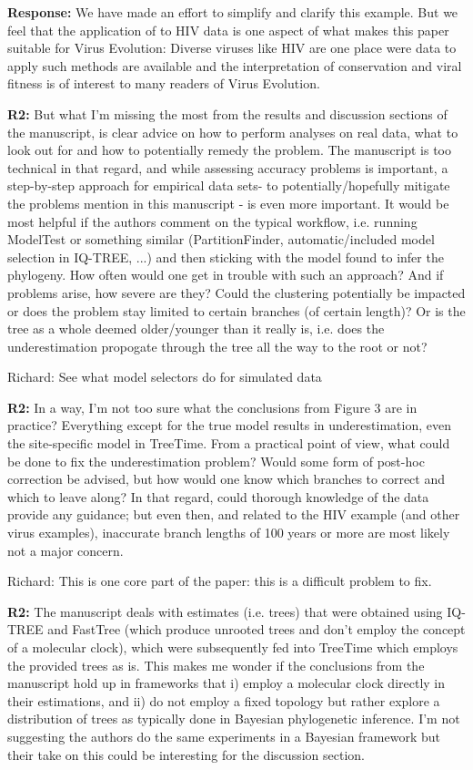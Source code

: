 \documentclass[aps,rmp,onecolumn]{revtex4-1}
\newcommand{\Richard}[1]{{\color{drab}Richard: #1}}
\newcommand{\refb}[1]{\textbf{R2:} #1}
\newcommand{\response}[1]{{\color{black}\textbf{Response:} #1}}
\begin{document}
\response{We have made an effort to simplify and clarify this example. But we feel that the application of to HIV data is one aspect of what makes this paper suitable for Virus Evolution: Diverse viruses like HIV are one place were data to apply such methods are available and the interpretation of conservation and viral fitness is of interest to many readers of Virus Evolution. }

\refb{But what I’m missing the most from the results and discussion sections of the manuscript, is clear advice on how to perform analyses on real data, what to look out for and how to potentially remedy the problem. The manuscript is too technical in that regard, and while assessing accuracy problems is important, a step-by-step approach for empirical data sets- to potentially/hopefully mitigate the problems mention in this manuscript - is even more important. It would be most helpful if the authors comment on the typical workflow, i.e. running ModelTest or something similar (PartitionFinder, automatic/included model selection in IQ-TREE, ...) and then sticking with the model found to infer the phylogeny. How often would one get in trouble with such an approach? And if problems arise, how severe are they? Could the clustering potentially be impacted or does the problem stay limited to certain branches (of certain length)? Or is the tree as a whole deemed older/younger than it really is, i.e. does the underestimation propogate through the tree all the way to the root or not?}

\Richard{See what model selectors do for simulated data}


\refb{In a way, I’m not too sure what the conclusions from Figure 3 are in practice? Everything except for the true model results in underestimation, even the site-specific model in TreeTime. From a practical point of view, what could be done to fix the underestimation problem? Would some form of post-hoc correction be advised, but how would one know which branches to correct and which to leave along? In that regard, could thorough knowledge of the data provide any guidance; but even then, and related to the HIV example (and other virus examples), inaccurate branch lengths of 100 years or more are most likely not a major concern.}

\Richard{This is one core part of the paper: this is a difficult problem to fix. }


\refb{The manuscript deals with estimates (i.e. trees) that were obtained using IQ-TREE and FastTree (which produce unrooted trees and don’t employ the concept of a molecular clock), which were subsequently fed into TreeTime which employs the provided trees as is. This makes me wonder if the conclusions from the manuscript hold up in frameworks that i) employ a molecular clock directly in their estimations, and ii) do not employ a fixed topology but rather explore a distribution of trees as typically done in Bayesian phylogenetic inference. I’m not suggesting the authors do the same experiments in a Bayesian framework but their take on this could be interesting for the discussion section.}
\end{document}
